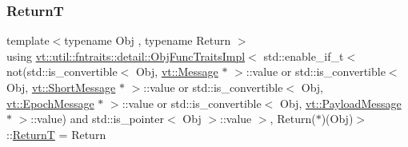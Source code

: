 \subsubsection{\texorpdfstring{ReturnT}{ReturnT}}
{\footnotesize\ttfamily template$<$typename Obj , typename Return $>$ \\
using \hyperlink{structvt_1_1util_1_1fntraits_1_1detail_1_1_obj_func_traits_impl}{vt\+::util\+::fntraits\+::detail\+::\+Obj\+Func\+Traits\+Impl}$<$ std\+::enable\+\_\+if\+\_\+t$<$ not(std\+::is\+\_\+convertible$<$ Obj, \hyperlink{namespacevt_a3a3ddfef40b4c90915fa43cdd5f129ea}{vt\+::\+Message} $\ast$ $>$\+::value or std\+::is\+\_\+convertible$<$ Obj, \hyperlink{namespacevt_a1125ac1da6c0bbf141e0ea0739d7602d}{vt\+::\+Short\+Message} $\ast$ $>$\+::value or std\+::is\+\_\+convertible$<$ Obj, \hyperlink{namespacevt_ad67368ffae52d7325002586b41bb150e}{vt\+::\+Epoch\+Message} $\ast$ $>$\+::value or std\+::is\+\_\+convertible$<$ Obj, \hyperlink{namespacevt_a89a92229c5622b855c02c549f83a1a68}{vt\+::\+Payload\+Message} $\ast$ $>$\+::value) and std\+::is\+\_\+pointer$<$ Obj $>$\+::value $>$, Return($\ast$)(Obj)$>$\+::\hyperlink{structvt_1_1util_1_1fntraits_1_1detail_1_1_obj_func_traits_impl_3_01std_1_1enable__if__t_3_01not8a3cf894b8afc41bf28f29f3b0ac693f_ae6ad5ba475ead2c5558dd406b5a383c7}{ReturnT} =  Return}

